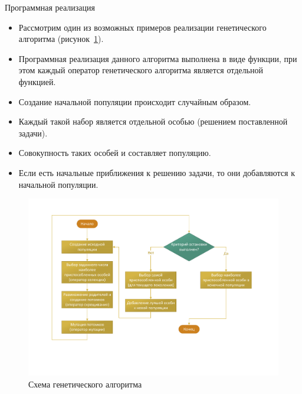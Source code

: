 \documentclass[aspectratio=169, mathserif]{beamer}	%
\begin{document}
\begin{frame}[fragile]{Программная реализация}
\begin{minipage}{.45\textwidth}
\scriptsize
\begin{itemize}
	\item Рассмотрим один из возможных примеров реализации генетического алгоритма (рисунок~\ref{fig:ga3}).
	\item Программная реализация данного алгоритма выполнена в виде функции, при этом каждый оператор генетического алгоритма является отдельной функцией.
	\item Создание начальной популяции происходит случайным образом.
	\item  Каждый такой набор является отдельной особью (решением поставленной задачи).
	\item Совокупность таких особей и составляет популяцию.
	\item Если есть начальные приближения к решению задачи, то они добавляются к начальной популяции.
\end{itemize}
\end{minipage}
\begin{minipage}{.53\textwidth}
\begin{figure}[h!]
	\centering
	\includegraphics[width=1.15\textwidth]{pics/ga3}
	\caption{Схема генетического алгоритма}
	\label{fig:ga3}
\end{figure}
\end{minipage}
\vfill
\end{frame}
\end{document}
